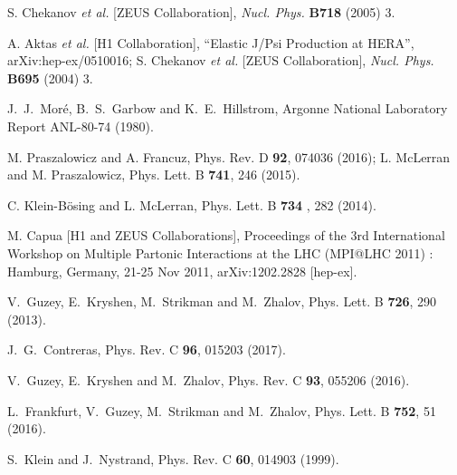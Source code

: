 \documentclass[twocolumn,showpacs,preprintnumbers,amsmath,amssymb,showkeys,aps,prd,a4paper,byrevtex]{revtex4}
\begin{document}
\begin{thebibliography}{99}
S. Chekanov {\it et al.} [ZEUS Collaboration], {\it Nucl. Phys.} {\bf B718} 
(2005) 3.

A. Aktas {\it et al.} [H1 Collaboration], ``Elastic J/Psi Production at HERA'', 
arXiv:hep-ex/0510016; S. Chekanov {\it et al.} [ZEUS Collaboration], {\it Nucl. 
Phys.} {\bf B695} (2004) 3.

  J.~J.~Mor\'e, B.~S.~Garbow and K.~E.~Hillstrom, %
  Argonne National Laboratory Report ANL-80-74 (1980).

 M. Praszalowicz and A. Francuz, Phys. Rev. D {\bf 92}, 074036 (2016); L. McLerran and M. Praszalowicz, Phys. Lett. B {\bf 741}, 246  (2015). 

 C. Klein-B\"{o}sing and L. McLerran, Phys. Lett. B {\bf 734 }, 282 (2014).

 M. Capua [H1 and ZEUS Collaborations], Proceedings of the 3rd International Workshop on Multiple Partonic Interactions at the LHC (MPI@LHC 2011) : Hamburg, Germany, 21-25 Nov 2011, arXiv:1202.2828 [hep-ex].

  V.~Guzey, E.~Kryshen, M.~Strikman and M.~Zhalov,  Phys.  Lett.  B {\bf 726}, 290 (2013).

  J.~G.~Contreras,   Phys.  Rev.  C {\bf 96}, 015203  (2017).

  V.~Guzey, E.~Kryshen and M.~Zhalov,   Phys. Rev. C  {\bf 93}, 055206 (2016).

  L.~Frankfurt, V.~Guzey, M.~Strikman and M.~Zhalov,  Phys.  Lett. B {\bf 752}, 51 (2016).

  S.~Klein and J.~Nystrand,   Phys. Rev. C {\bf 60}, 014903 (1999).


\end{thebibliography}
\end{document}

